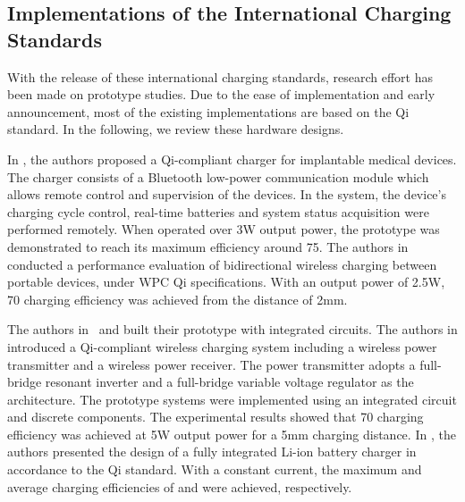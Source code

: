 \documentclass[twocolumn,10pt]{IEEEtran}
\begin{document}
\subsection{Implementations of the International Charging Standards}


With the release of these international charging standards, research effort has been made on prototype studies. 
Due to the ease of implementation and early announcement, most of the existing implementations are based on the Qi standard. In the following, we review these hardware designs.   

In \cite{S2014Hached}, the authors proposed a Qi-compliant charger for implantable medical devices. The charger consists of a Bluetooth low-power communication module which allows remote control and supervision of the devices. In the system, the device's charging cycle control, real-time batteries and system status acquisition were performed remotely. When operated over 3W output power, the prototype was demonstrated to reach its maximum efficiency around 75. The authors in~\cite{S2013Miura} conducted a performance evaluation of bidirectional wireless charging between portable devices, under WPC Qi specifications. With an output power of 2.5W, 70 charging efficiency was achieved from the distance of 2mm. 

The authors in~\cite{M2013Galizzi} and \cite{V.2015Quang} built their prototype with integrated circuits. The authors in \cite{M2013Galizzi} introduced a Qi-compliant wireless charging system including a wireless power transmitter and a wireless power receiver. The power transmitter adopts a full-bridge resonant inverter and a full-bridge variable voltage regulator as the architecture. The prototype systems were implemented using an integrated circuit and discrete components. The experimental results showed that 70 charging efficiency was achieved at 5W output power for a 5mm charging distance. In \cite{V.2015Quang}, the authors presented the design of a fully integrated Li-ion battery charger in accordance to the Qi standard. With a constant current, the maximum and average charging efficiencies of  and  were achieved, respectively.
\end{document}
